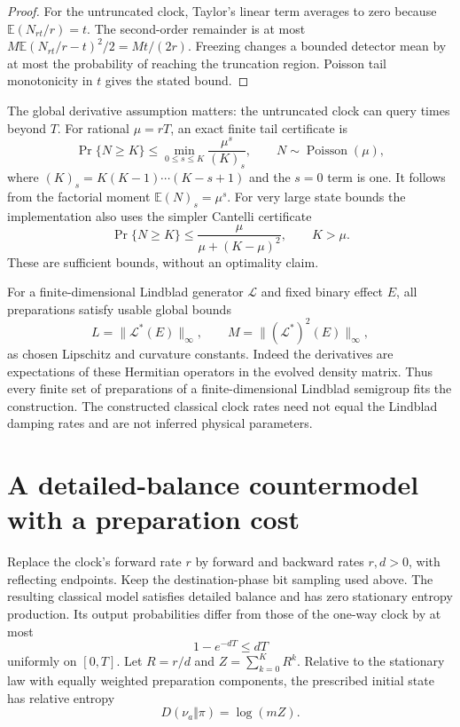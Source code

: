 \begin{proof}
For the untruncated clock, Taylor's linear term averages to zero because
$\mathbb E(N_{rt}/r)=t$. The second-order remainder is at most
$M\mathbb E(N_{rt}/r-t)^2/2=Mt/(2r)$. Freezing changes a bounded detector
mean by at most the probability of reaching the truncation region. Poisson
tail monotonicity in $t$ gives the stated bound.
\end{proof}

The global derivative assumption matters: the untruncated clock can query
times beyond $T$. For rational $\mu=rT$, an exact finite tail certificate is
\begin{equation}
 \Pr\{N\ge K\}\le
 \min_{0\le s\le K}\frac{\mu^s}{(K)_s},
 \qquad N\sim\operatorname{Poisson}(\mu),
 \label{rf:factorial-tail}
\end{equation}
where $(K)_s=K(K-1)\cdots(K-s+1)$ and the $s=0$ term is one.
It follows from the factorial moment $\mathbb E(N)_s=\mu^s$.
For very large state bounds the implementation also uses the simpler Cantelli
certificate
\[
 \Pr\{N\ge K\}\le \frac{\mu}{\mu+(K-\mu)^2},\qquad K>\mu.
\]
These are sufficient bounds, without an optimality claim.

For a finite-dimensional Lindblad generator $\mathcal L$ and fixed binary
effect $E$, all preparations satisfy usable global bounds
\[
 L=\|\mathcal L^*(E)\|_\infty,\qquad
 M=\|(\mathcal L^*)^2(E)\|_\infty,
\]
as chosen Lipschitz and curvature constants. Indeed the derivatives are expectations of these Hermitian
operators in the evolved density matrix. Thus every finite set of
preparations of a finite-dimensional Lindblad semigroup fits the construction.
The constructed classical clock rates need not equal the Lindblad damping
rates and are not inferred physical parameters.

\section{A detailed-balance countermodel with a preparation cost}

\begin{theorem}
\label{rf:reversible-realization}
Replace the clock's forward rate $r$ by forward and backward rates $r,d>0$,
with reflecting endpoints. Keep the destination-phase bit sampling used
above. The resulting classical model satisfies detailed balance and has zero
stationary entropy production. Its output probabilities differ from those of
the one-way clock by at most
\begin{equation}
 1-e^{-dT}\le dT
 \label{rf:backward-coupling}
\end{equation}
uniformly on $[0,T]$. Let $R=r/d$ and $Z=\sum_{k=0}^{K}R^k$. Relative to the
stationary law with equally weighted preparation components, the prescribed
initial state has relative entropy
\begin{equation}
 D(\nu_a\Vert\pi)=\log(mZ).
 \label{rf:preparation-cost}
\end{equation}
\end{theorem}

